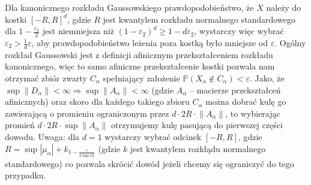 \documentclass{article}
\begin{document}
Dla kanonicznego rozkładu Gaussowskiego prawdopodobieństwo, że $X$ należy do kostki $[-R,R]^d$, gdzie $R$ jest kwantylem rozkładu normalnego standardowego dla $1-\frac{\varepsilon_2}{2}$
jest niemniejsza niż $(1-\varepsilon_2)^d\ge1-d\varepsilon_2$, wystarczy więc wybrać $\varepsilon_2>\frac{1}{d}\varepsilon$, aby prawdopodobieństwo leżenia poza kostką było mniejsze od $\varepsilon$.
Ogólny rozkład Gaussowski jest z definicji afinicznym przekształceniem rozkładu kanonicznego, więc to samo afiniczne przekształcenie kostki pozwala nam otrzymać zbiór zwarty $C_\alpha$
spełniający założenie $\mathbb{P}(X_\alpha\notin C_\alpha)<\varepsilon$. Jako, że $\sup\lVert D_\alpha\rVert<\infty\Rightarrow \sup\lVert A_\alpha\rVert<\infty$ (gdzie $A_\alpha$ -- macierze przekształceń afinicznych)
oraz skoro dla każdego takiego zbioru $C_\alpha$ można dobrać kulę go zawierającą o promieniu ograniczonym przez $d\cdot 2R\cdot \lVert A_\alpha\rVert$, to wybierając promień
$d\cdot 2R\cdot\sup\lVert A_\alpha\rVert$ otrzymujemy kulę pasującą do pierwszej części dowodu.\newline\newline
Uwaga: dla $d=1$ wystarczy wybrać odcinek $[-R,R]$, gdzie $R=\sup|\mu_\alpha|+k_{1-\frac{\varepsilon}{2\sup\sigma^2_\alpha}}$ (gdzie $k$ jest kwantylem rozkłądu normalnego standardowego) 
co pozwala skrócić dowód jeżeli chcemy się ograniczyć do tego przypadku.
\end{document}
